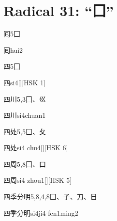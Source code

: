 
\section*{Radical 31: ``⼞''}

\begin{entry}{囘}{5}{⼞}
  \begin{phonetics}{囘}{hui2}
  \end{phonetics}
\end{entry}

\begin{entry}{四}{5}{⼞}
  \begin{phonetics}{四}{si4}[][HSK 1]
  \end{phonetics}
\end{entry}

\begin{entry}{四川}{5,3}{⼞、⼮}
  \begin{phonetics}{四川}{si4chuan1}
  \end{phonetics}
\end{entry}

\begin{entry}{四处}{5,5}{⼞、⼡}
  \begin{phonetics}{四处}{si4 chu4}[][HSK 6]
  \end{phonetics}
\end{entry}

\begin{entry}{四周}{5,8}{⼞、⼝}
  \begin{phonetics}{四周}{si4 zhou1}[][HSK 5]
  \end{phonetics}
\end{entry}

\begin{entry}{四季分明}{5,8,4,8}{⼞、⼦、⼑、⽇}
  \begin{phonetics}{四季分明}{si4ji4-fen1ming2}
  \end{phonetics}
\end{entry}

